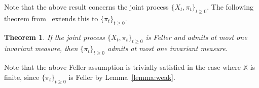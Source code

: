 \documentclass[conference, draftcls, onecolumn]{IEEEtran}
\newtheorem{theorem}{Theorem}
\begin{document}
Note that the above result concerns the joint process \( \{X_t,\pi_t \}_{t\ge0} \). The following theorem from~\cite{Stettner} extends this to \( \{\pi_t \}_{t\ge0} \).

\begin{theorem}\label{theorem:3.2}\cite[Theorem 3]{Stettner}
    If the joint process \( \{X_t,\pi_t \}_{t\ge0} \) is Feller and admits at most one invariant measure, then \( \{\pi_t\}_{t\ge0} \) admits at most one invariant measure.
\end{theorem}

Note that the above Feller assumption is trivially satisfied in the case where \( \mathbb{X} \) is finite, since \( \{\pi_t\}_{t\ge0} \) is Feller by Lemma~\ref{lemma:weak}.

\printbibliography
\end{document}
